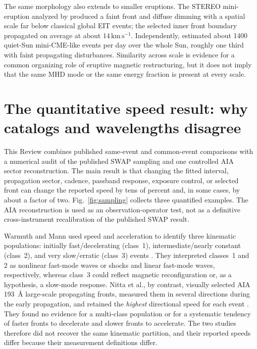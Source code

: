\documentclass[11pt]{article}
\let\parencite\citep
\let\textcite\citet
\newcommand{\kms}{\mathrm{km\,s^{-1}}}
\begin{document}
The same morphology also extends to smaller eruptions. The STEREO mini-eruption analyzed by \textcite{Podladchikova2010} produced a faint front and diffuse dimming with a spatial scale far below classical global EIT events; the selected inner front boundary propagated on average at about $14\,\kms$. Independently, \textcite{Innes2009} estimated about 1400 quiet-Sun mini-CME-like events per day over the whole Sun, roughly one third with faint propagating disturbances. Similarity across scale is evidence for a common organizing role of eruptive magnetic restructuring, but it does not imply that the same MHD mode or the same energy fraction is present at every scale.

\section{The quantitative speed result: why catalogs and wavelengths disagree}
This Review combines published same-event and common-event comparisons with a numerical audit of the published SWAP sampling and one controlled AIA sector reconstruction. The main result is that changing the fitted interval, propagation sector, cadence, passband response, exposure control, or selected front can change the reported speed by tens of percent and, in some cases, by about a factor of two. Fig.~\ref{fig:sampling} collects three quantified examples. The AIA reconstruction is used as an observation-operator test, not as a definitive cross-instrument recalibration of the published SWAP result.

Warmuth and Mann used speed and acceleration to identify three kinematic populations: initially fast/decelerating (class~1), intermediate/nearly constant (class~2), and very slow/erratic (class~3) events \parencite{WarmuthMann2011,Warmuth2015}. They interpreted classes~1 and 2 as nonlinear fast-mode waves or shocks and linear fast-mode waves, respectively, whereas class~3 could reflect magnetic reconfiguration or, as a hypothesis, a slow-mode response. Nitta et al., by contrast, visually selected AIA 193~\AA{} large-scale propagating fronts, measured them in several directions during the early propagation, and retained the \emph{highest} directional speed for each event \parencite{Nitta2013}. They found no evidence for a multi-class population or for a systematic tendency of faster fronts to decelerate and slower fronts to accelerate. The two studies therefore did not recover the same kinematic partition, and their reported speeds differ because their measurement definitions differ.
\end{document}
